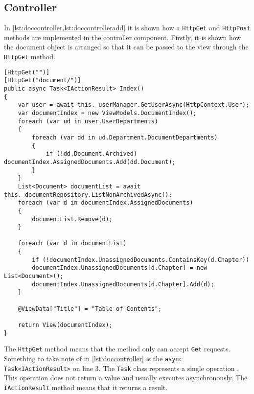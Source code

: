 \subsection{Controller}

In \cref{lst:doccontroller,lst:doccontrolleradd} it is shown how a \texttt{HttpGet} and \texttt{HttpPost} methods are implemented in the controller component.
Firstly, it is shown how the document object is arranged so that it can be passed to the view through the \texttt{HttpGet} method.
\\

\begin{lstlisting}[caption={Document Controller: Index}, label={lst:doccontroller}]
[HttpGet("")]
[HttpGet("document/")]
public async Task<IActionResult> Index()
{
	var user = await this._userManager.GetUserAsync(HttpContext.User);
	var documentIndex = new ViewModels.DocumentIndex();
	foreach (var ud in user.UserDepartments)
	{
		foreach (var dd in ud.Department.DocumentDepartments)
		{
			if (!dd.Document.Archived) documentIndex.AssignedDocuments.Add(dd.Document);
		}
	}
	List<Document> documentList = await this._documentRepository.ListNonArchivedAsync();
	foreach (var d in documentIndex.AssignedDocuments)
	{
		documentList.Remove(d);
	}

	foreach (var d in documentList)
	{
		if (!documentIndex.UnassignedDocuments.ContainsKey(d.Chapter))
		documentIndex.UnassignedDocuments[d.Chapter] = new List<Document>();
		documentIndex.UnassignedDocuments[d.Chapter].Add(d);
	}

	@ViewData["Title"] = "Table of Contents";

	return View(documentIndex);
}
\end{lstlisting}

The \texttt{HttpGet} method means that the method only can accept \texttt{Get} requests.
Something to take note of in \cref{lst:doccontroller} is the \texttt{async Task<IActionResult>} on line 3.
The \texttt{Task} class represents a single operation \cite{microsoft}.
This operation does not return a value and usually executes asynchronously.
The \texttt{IActionResult} method means that it returns a result.

